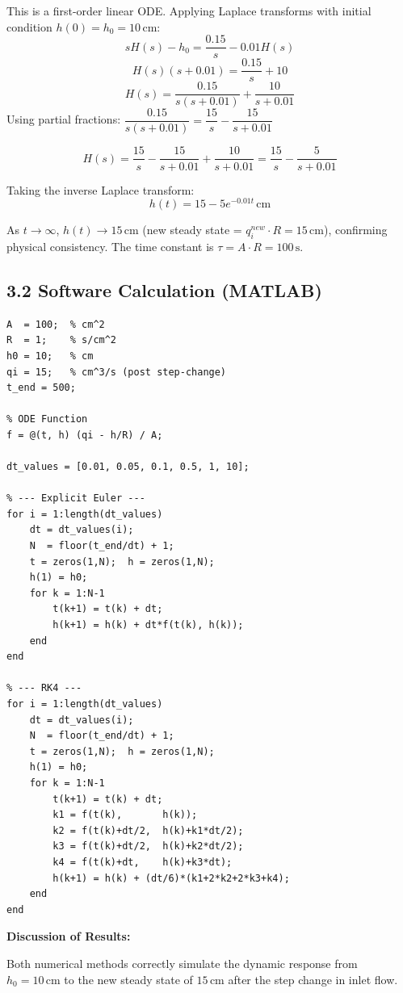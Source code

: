 \documentclass[12pt,a4paper]{article}
\begin{document}
This is a first-order linear ODE. Applying Laplace transforms with initial condition $h(0) = h_0 = 10\,\text{cm}$:
\[
sH(s) - h_0 = \frac{0.15}{s} - 0.01H(s)
\]
\[
H(s)(s + 0.01) = \frac{0.15}{s} + 10
\]
\[
H(s) = \frac{0.15}{s(s + 0.01)} + \frac{10}{s + 0.01}
\]
Using partial fractions: $\dfrac{0.15}{s(s+0.01)} = \dfrac{15}{s} - \dfrac{15}{s+0.01}$

\[
H(s) = \frac{15}{s} - \frac{15}{s+0.01} + \frac{10}{s+0.01} = \frac{15}{s} - \frac{5}{s+0.01}
\]

Taking the inverse Laplace transform:
\[
\boxed{h(t) = 15 - 5e^{-0.01t}\,\text{cm}}
\tag{3.3}
\]

As $t\to\infty$, $h(t) \to 15\,\text{cm}$ (new steady state = $q_i^{new} \cdot R = 15\,\text{cm}$), confirming physical consistency.
The time constant is $\tau = A \cdot R = 100\,\text{s}$.

\subsection{3.2 Software Calculation (MATLAB)}

\begin{lstlisting}[style=matlabstyle, caption={Q3 -- Explicit Euler and RK4 methods}]
A  = 100;  % cm^2
R  = 1;    % s/cm^2
h0 = 10;   % cm
qi = 15;   % cm^3/s (post step-change)
t_end = 500;

% ODE Function
f = @(t, h) (qi - h/R) / A;

dt_values = [0.01, 0.05, 0.1, 0.5, 1, 10];

% --- Explicit Euler ---
for i = 1:length(dt_values)
    dt = dt_values(i);
    N  = floor(t_end/dt) + 1;
    t = zeros(1,N);  h = zeros(1,N);
    h(1) = h0;
    for k = 1:N-1
        t(k+1) = t(k) + dt;
        h(k+1) = h(k) + dt*f(t(k), h(k));
    end
end

% --- RK4 ---
for i = 1:length(dt_values)
    dt = dt_values(i);
    N  = floor(t_end/dt) + 1;
    t = zeros(1,N);  h = zeros(1,N);
    h(1) = h0;
    for k = 1:N-1
        t(k+1) = t(k) + dt;
        k1 = f(t(k),       h(k));
        k2 = f(t(k)+dt/2,  h(k)+k1*dt/2);
        k3 = f(t(k)+dt/2,  h(k)+k2*dt/2);
        k4 = f(t(k)+dt,    h(k)+k3*dt);
        h(k+1) = h(k) + (dt/6)*(k1+2*k2+2*k3+k4);
    end
end
\end{lstlisting}

\textbf{Discussion of Results:}

Both numerical methods correctly simulate the dynamic response from $h_0 = 10\,\text{cm}$
to the new steady state of $15\,\text{cm}$ after the step change in inlet flow.
\end{document}
